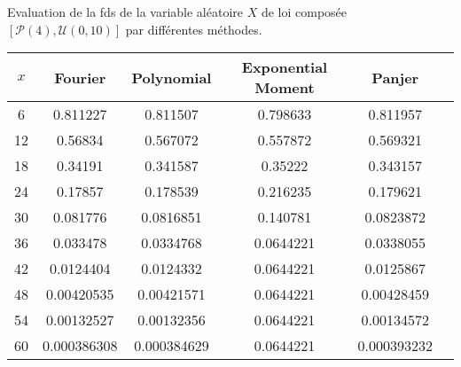 	\begin{tableth}
		\caption[Approximations de la \gls{fds} d'une loi $\left(\mathcal{P}(4),\mathcal{U}(0,10)\right)$]{Evaluation de la \gls{fds} de la variable aléatoire $X$ de loi composée $\left[\mathcal{P}(4),\mathcal{U}(0,10)\right]$ par différentes méthodes.}
			\label{TableSurvivalDifferentMethodCompoundPoissonUniform}
		\begin{tabular}{|c||c|c|c|c|c|}
\hline
$x$ & Fourier&Polynomial  & Exponential Moment &Panjer \\
\hline
\hline
6 & 0.811227 & 0.811507 & 0.798633 & 0.811957 \\
 12 & 0.56834 & 0.567072 & 0.557872 & 0.569321 \\
 18 & 0.34191 & 0.341587 & 0.35222 & 0.343157 \\
 24 & 0.17857 & 0.178539 & 0.216235 & 0.179621 \\
 30 & 0.081776 & 0.0816851 & 0.140781 & 0.0823872 \\
 36 & 0.033478 & 0.0334768 & 0.0644221 & 0.0338055 \\
 42 & 0.0124404 & 0.0124332 & 0.0644221 & 0.0125867 \\
 48 & 0.00420535 & 0.00421571 & 0.0644221 & 0.00428459 \\
 54 & 0.00132527 & 0.00132356 & 0.0644221 & 0.00134572 \\
 60 & 0.000386308 & 0.000384629 & 0.0644221 & 0.000393232 \\

\hline
		\end{tabular}
	\end{tableth}

